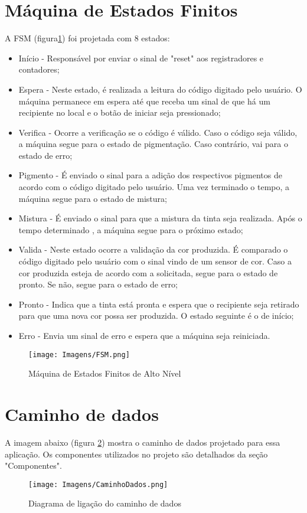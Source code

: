 \documentclass[12pt,a4paper,oneside]{abntex2}
\begin{document}
        \section{Máquina de Estados Finitos}
            A FSM (figura\ref{fig:FSM}) foi projetada com 8 estados:
            \begin{itemize}
                \item Início - Responsável por enviar o sinal de "reset" aos registradores e contadores;
                \item Espera - Neste estado, é realizada a leitura do código digitado pelo usuário. O máquina permanece em espera até que receba um sinal de que há um recipiente no local e o botão de iniciar seja pressionado;
                \item Verifica - Ocorre a verificação se o código é válido. Caso o código seja válido, a máquina segue para o estado de pigmentação. Caso contrário, vai para o estado de erro;
                \item Pigmento - É enviado o sinal para a adição dos respectivos pigmentos de acordo com o código digitado pelo usuário. Uma vez terminado o tempo, a máquina segue para o estado de mistura;
                \item Mistura - É enviado o sinal para que a mistura da tinta seja realizada. Após o tempo determinado , a máquina segue para o próximo estado;
                \item Valida - Neste estado ocorre a validação da cor produzida. É comparado o código digitado pelo usuário com o sinal vindo de um sensor de cor. Caso a cor produzida esteja de acordo com a solicitada, segue para o estado de pronto. Se não, segue para o estado de erro;
                \item Pronto - Indica que a tinta está pronta e espera que o recipiente seja retirado para que uma nova cor possa ser produzida. O estado seguinte é o de início;
                \item Erro - Envia um sinal de erro e espera que a máquina seja reiniciada.
            \end{itemize}
            \begin{figure}[h]
                \centering
                \texttt{[image: Imagens/FSM.png]}
                \caption{Máquina de  Estados Finitos de Alto Nível}
                \label{fig:FSM}
            \end{figure}
            \newpage
        \section{Caminho de dados}  
            A imagem abaixo (figura \ref{fig:CaminhoDados}) mostra o caminho de dados projetado para essa aplicação. Os componentes utilizados no projeto são detalhados da seção "Componentes".
            \begin{figure}[H]
                \centering
                \texttt{[image: Imagens/CaminhoDados.png]}
                \caption{Diagrama de ligação do caminho de dados}
                \label{fig:CaminhoDados}
            \end{figure}
\end{document}
